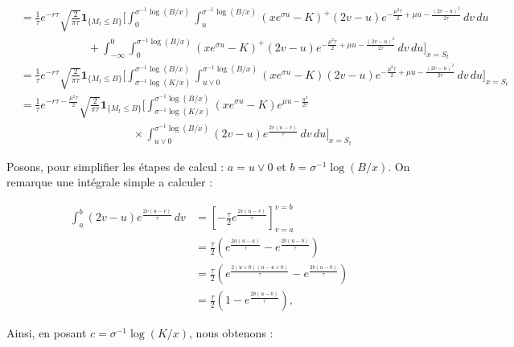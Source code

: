 \documentclass[11pt]{article}
\begin{document}
\begin{align*}
&= \frac{1}{\tau} e^{-r\tau} \sqrt{\frac{2}{\pi\tau}} \mathbf{1}_{\{M_t \le B\}} \Bigg[ \int_{0}^{\sigma^{-1}\log(B/x)} \int_{u}^{\sigma^{-1}\log(B/x)} (x e^{\sigma u} - K)^+ (2v - u) e^{-\frac{\mu^2\tau}{2} + \mu u - \frac{(2v-u)^2}{2\tau}} \, dv \, du \\
&\qquad \qquad \qquad + \int_{-\infty}^{0} \int_{0}^{\sigma^{-1}\log(B/x)} (x e^{\sigma u} - K)^+ (2v - u) e^{-\frac{\mu^2\tau}{2} + \mu u - \frac{(2v-u)^2}{2\tau}} \, dv \, du \Bigg]_{x=S_t} \\
&= \frac{1}{\tau} e^{-r\tau} \sqrt{\frac{2}{\pi\tau}} \mathbf{1}_{\{M_t \le B\}} \Bigg[ \int_{\sigma^{-1}\log(K/x)}^{\sigma^{-1}\log(B/x)} \int_{u \vee 0}^{\sigma^{-1}\log(B/x)} (x e^{\sigma u} - K) (2v - u) e^{-\frac{\mu^2\tau}{2} + \mu u - \frac{(2v-u)^2}{2\tau}} \, dv \, du \Bigg]_{x=S_t} \\
&= \frac{1}{\tau} e^{-r\tau - \frac{\mu^2\tau}{2}} \sqrt{\frac{2}{\pi\tau}} \mathbf{1}_{\{M_t \le B\}} \Bigg[ \int_{\sigma^{-1}\log(K/x)}^{\sigma^{-1}\log(B/x)} (x e^{\sigma u} - K) e^{\mu u - \frac{u^2}{2\tau}} \\
&\qquad \qquad \qquad \qquad \qquad \times \int_{u \vee 0}^{\sigma^{-1}\log(B/x)} (2v - u) e^{\frac{2v(u-v)}{\tau}} \, dv \, du \Bigg]_{x=S_t}
\end{align*}

Posons, pour simplifier les étapes de calcul : $a = u \vee 0$ et $b = \sigma^{-1}\log(B/x)$. On remarque une intégrale simple a calculer :

\begin{align*}
\int_a^b (2v - u) e^{\frac{2v(u-v)}{\tau}} \, dv &= \left[ -\frac{\tau}{2} e^{\frac{2v(u-v)}{\tau}} \right]_{v=a}^{v=b} \\
&= \frac{\tau}{2} \left( e^{\frac{2a(u-a)}{\tau}} - e^{\frac{2b(u-b)}{\tau}} \right) \\
&= \frac{\tau}{2} \left( e^{\frac{2(u \vee 0)(u - u \vee 0)}{\tau}} - e^{\frac{2b(u-b)}{\tau}} \right) \\
&= \frac{\tau}{2} \left( 1 - e^{\frac{2b(u-b)}{\tau}} \right),
\end{align*}

Ainsi, en posant $c = \sigma^{-1} \log(K/x)$, nous obtenons :
\end{document}
